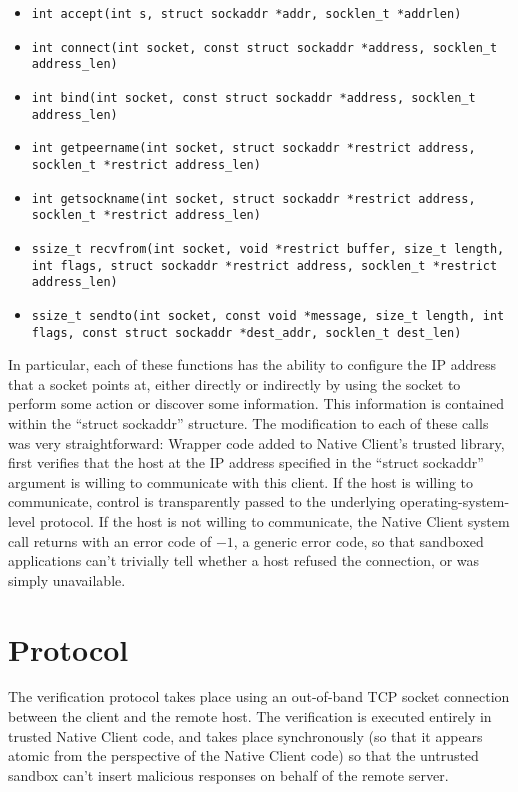 \documentclass[a4paper,10pt]{article}
\begin{document}
\begin{itemize}
\item \texttt{int accept(int s, struct sockaddr *addr, socklen\_t *addrlen)}
\item \texttt{int connect(int socket, const struct sockaddr *address,
       socklen\_t address\_len)}
\item \texttt{int bind(int socket, const struct sockaddr *address,
       socklen\_t address\_len)}

\item \texttt{int getpeername(int socket, struct sockaddr *restrict address,
       socklen\_t *restrict address\_len)}
\item \texttt{int getsockname(int socket, struct sockaddr *restrict address,
       socklen\_t *restrict address\_len)}

\item \texttt{ssize\_t recvfrom(int socket, void *restrict buffer, size\_t
length,
       int flags, struct sockaddr *restrict address,
       socklen\_t *restrict address\_len)}
\item \texttt{ssize\_t sendto(int socket, const void *message, size\_t length,
       int flags, const struct sockaddr *dest\_addr,
       socklen\_t dest\_len)}
\end{itemize}

In particular, each of these functions has the ability to configure the IP
address that a socket points at, either directly or indirectly by using
the socket to perform some action or discover some information.  This
information is contained within the ``struct sockaddr'' structure.  The
modification to each of these calls was very straightforward: Wrapper code added
to Native Client's trusted library, first verifies that the host at the
IP address specified in the ``struct sockaddr'' argument is willing to
communicate with this client.  If the host is willing to communicate, control
is transparently passed to the underlying operating-system-level protocol.  If
the host is not willing to communicate, the Native Client system call returns
with an error code of $-1$, a generic error code, so that sandboxed
applications can't trivially tell whether a host refused the connection, or was
simply unavailable.

\section{Protocol}

The verification protocol takes place using an out-of-band TCP socket
connection between the client and the remote host.  The verification is
executed entirely in trusted Native Client code, and takes place synchronously
(so that it appears atomic from the perspective of the Native Client code) so
that the untrusted sandbox can't insert malicious responses on behalf of the
remote server.
\end{document}
